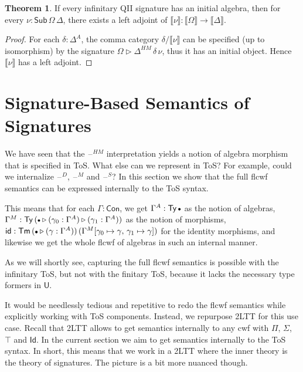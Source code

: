 \documentclass[12pt,a4paper,twoside,openany]{book}
\theoremstyle{remark}
\theoremstyle{definition}
\theoremstyle{theorem}
\newtheorem{theorem}{Theorem}
\newcommand{\id}{\mathsf{id}}
\newcommand{\Con}{\mathsf{Con}}
\newcommand{\Sub}{\mathsf{Sub}}
\newcommand{\Tm}{\mathsf{Tm}}
\newcommand{\Ty}{\mathsf{Ty}}
\newcommand{\U}{\mathsf{U}}
\newcommand{\Id}{\mathsf{Id}}
\newcommand{\blank}{\mathord{\hspace{1pt}\text{--}\hspace{1pt}}}
\newcommand{\ext}{\triangleright}
\newcommand{\emptycon}{\scaleobj{.75}\bullet}
\newcommand{\llb}{\llbracket}
\newcommand{\rrb}{\rrbracket}
\newcommand{\sem}[1]{\llb#1\rrb}
\begin{document}
\begin{theorem}
If every infinitary QII signature has an initial algebra, then for every $\nu :
\Sub\,\Omega\,\Delta$, there exists a left adjoint of $\sem{\nu} : \sem{\Omega}
\to \sem{\Delta}$.
\end{theorem}
\begin{proof}
For each $\delta : \Delta^A$, the comma category $\delta/\sem{\nu}$ can be
specified (up to isomorphism) by the signature $\Omega \ext
\Delta^{HM}\,\delta\,\nu$, thus it has an initial object. Hence $\sem{\nu}$ has
a left adjoint.
\end{proof}

\section{Signature-Based Semantics of Signatures}

We have seen that the $\blank^{HM}$ interpretation yields a notion of algebra
morphism that is specified in ToS. What else can we represent in ToS? For
example, could we internalize $\blank^D$, $\blank^M$ and $\blank^S$? In this
section we show that the full flcwf semantics can be expressed internally to
the ToS syntax.

This means that for each $\Gamma : \Con$, we get $\Gamma^A : \Ty\,\emptycon$ as
the notion of algebras, $\Gamma^M : \Ty\,(\emptycon\ext(\gamma_0 :
\Gamma^A)\ext(\gamma_1 : \Gamma^A))$ as the notion of morphisms, $\id :
\Tm\,(\emptycon\ext(\gamma : \Gamma^A))\,(\Gamma^M[\gamma_0 \mapsto
  \gamma,\,\gamma_1 \mapsto \gamma])$ for the identity morphisms, and likewise
we get the whole flcwf of algebras in such an internal manner.

As we will shortly see, capturing the full flcwf semantics is possible with the
infinitary ToS, but not with the finitary ToS, because it lacks the necessary
type formers in $\U$.

It would be needlessly tedious and repetitive to redo the flcwf semantics while
explicitly working with ToS components. Instead, we repurpose 2LTT for this use
case. Recall that 2LTT allows to get semantics internally to any cwf with $\Pi$,
$\Sigma$, $\top$ and $\Id$. In the current section we aim to get semantics
internally to the ToS syntax. In short, this means that we work in a 2LTT where
the inner theory is the theory of signatures. The picture is a bit more
nuanced though.
\end{document}
